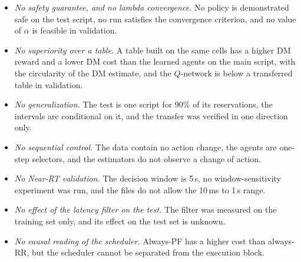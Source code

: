 \begin{itemize}
  \item \emph{No safety guarantee, and no lambda convergence.} No policy is demonstrated safe on the test script, no run satisfies the convergence criterion, and no value of $\alpha$ is feasible in validation.%
  \item \emph{No superiority over a table.} A table built on the same cells has a higher DM reward and a lower DM cost than the learned agents on the main script, with the circularity of the DM estimate, and the $Q$-network is below a transferred table in validation.%
  \item \emph{No generalization.} The test is one script for 90\% of its reservations, the intervals are conditional on it, and the transfer was verified in one direction only.%
  \item \emph{No sequential control.} The data contain no action change, the agents are one-step selectors, and the estimators do not observe a change of action.%
  \item \emph{No Near-RT validation.} The decision window is 5\,s, no window-sensitivity experiment was run, and the files do not allow the 10\,ms to 1\,s range.%
  \item \emph{No effect of the latency filter on the test.} The filter was measured on the training set only, and its effect on the test set is unknown.%
  \item \emph{No causal reading of the scheduler.} Always-PF has a higher cost than always-RR, but the scheduler cannot be separated from the execution block.%
\end{itemize}
